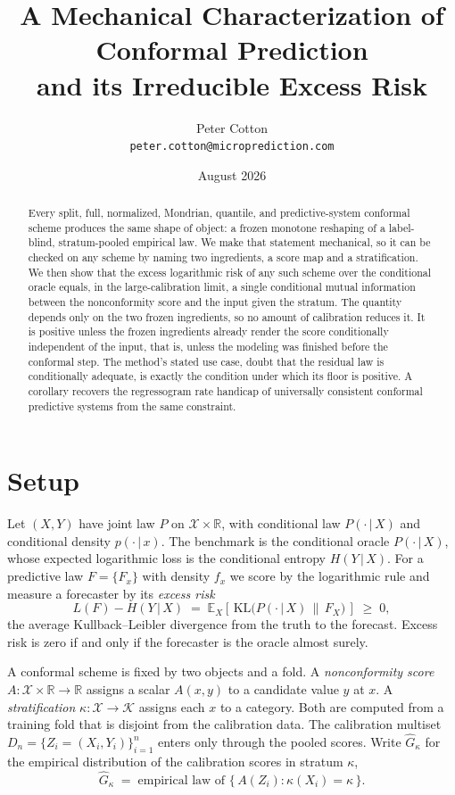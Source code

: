 \documentclass[11pt]{article}
\title{A Mechanical Characterization of Conformal Prediction\\ and its Irreducible Excess Risk}
\author{Peter Cotton\\\texttt{peter.cotton@microprediction.com}}
\date{August 2026}
\theoremstyle{definition}
\theoremstyle{remark}
\newcommand{\R}{\mathbb{R}}
\newcommand{\E}{\mathbb{E}}
\newcommand{\KL}{\mathrm{KL}}
\newcommand{\cX}{\mathcal{X}}
\newcommand{\cK}{\mathcal{K}}
\newcommand{\given}{\,|\,}
\begin{document}
\maketitle

\begin{abstract}
Every split, full, normalized, Mondrian, quantile, and predictive-system conformal
scheme produces the same shape of object: a frozen monotone reshaping of a
label-blind, stratum-pooled empirical law. We make that statement mechanical, so it
can be checked on any scheme by naming two ingredients, a score map and a
stratification. We then show that the excess logarithmic risk of any such scheme over
the conditional oracle equals, in the large-calibration limit, a single conditional
mutual information between the nonconformity score and the input given the stratum.
The quantity depends only on the two frozen ingredients, so no amount of calibration
reduces it. It is positive unless the frozen ingredients already render the score
conditionally independent of the input, that is, unless the modeling was finished
before the conformal step. The method's stated use case, doubt that the residual law
is conditionally adequate, is exactly the condition under which its floor is
positive. A corollary recovers the regressogram rate handicap of universally
consistent conformal predictive systems from the same constraint.
\end{abstract}

\section{Setup}

Let $(X,Y)$ have joint law $P$ on $\cX \times \R$, with conditional law $P(\cdot\given X)$
and conditional density $p(\cdot\given x)$. The benchmark is the conditional oracle
$P(\cdot\given X)$, whose expected logarithmic loss is the conditional entropy
$H(Y\given X)$. For a predictive law $F = \{F_x\}$ with density $f_x$ we score by the
logarithmic rule and measure a forecaster by its \emph{excess risk}
\begin{equation}\label{eq:excess}
  L(F) - H(Y\given X)
  \;=\; \E_X\!\left[\, \KL\big(P(\cdot\given X)\,\big\|\,F_X\big) \,\right] \;\ge\; 0 ,
\end{equation}
the average Kullback--Leibler divergence from the truth to the forecast. Excess risk is
zero if and only if the forecaster is the oracle almost surely.

A conformal scheme is fixed by two objects and a fold. A \emph{nonconformity score}
$A : \cX \times \R \to \R$ assigns a scalar $A(x,y)$ to a candidate value $y$ at $x$. A
\emph{stratification} $\kappa : \cX \to \cK$ assigns each $x$ to a category. Both are
computed from a training fold that is disjoint from the calibration data. The
calibration multiset $D_n = \{Z_i = (X_i,Y_i)\}_{i=1}^n$ enters only through the pooled
scores. Write $\widehat G_\kappa$ for the empirical distribution of the calibration
scores in stratum $\kappa$,
\[
  \widehat G_\kappa
  \;=\; \text{empirical law of } \{\, A(Z_i) : \kappa(X_i) = \kappa \,\}.
\]
\end{document}
